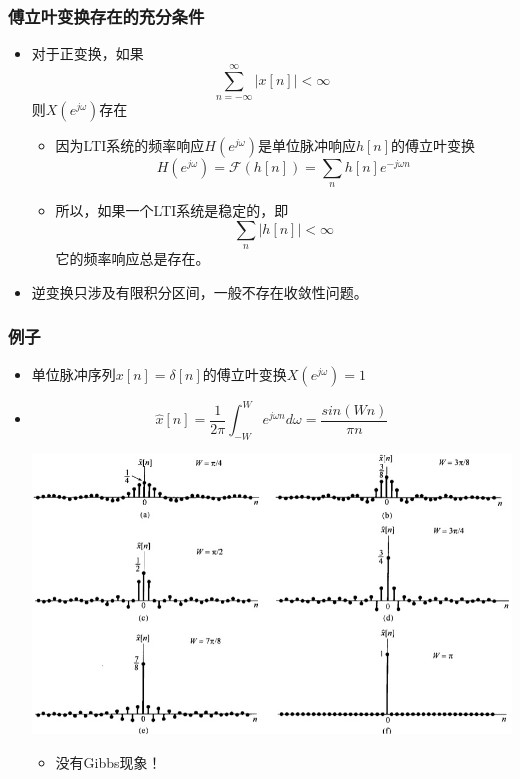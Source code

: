 \documentclass[CJKutf8,xcolor=pdftex,dvipsnames,table]{beamer}
\begin{document}
\begin{CJK*}{UTF8}{song}
\begin{frame}
  \end{frame}  
  
  \begin{frame}
    \frametitle{傅立叶变换存在的充分条件}
    \begin{itemize}
    \item 对于正变换，如果
    \[
    	 \sum_{n=-\infty}^{\infty}|x[n]| < \infty
    \]
    则$X(e^{j\omega})$存在
    	\begin{itemize}
		\item 因为LTI系统的频率响应$H(e^{j\omega})$是单位脉冲响应$h[n]$的傅立叶变换
		\[
			H(e^{j\omega})=\mathscr{F}(h[n])=\sum_n h[n]e^{-j\omega n}
		\]   
		\item 所以，如果一个LTI系统是稳定的，即
		\[
			\sum_n|h[n]| < \infty
		\]
		它的频率响应总是存在。		
		\end{itemize}
    \item 逆变换只涉及有限积分区间，一般不存在收敛性问题。
    
 
    \end{itemize}

  \end{frame} 
        
  \begin{frame}
    \frametitle{例子}
    \begin{itemize}
    \item 单位脉冲序列$x[n]=\delta[n]$的傅立叶变换$X(e^{j\omega})=1$
	\item 
	\[
	\hat{x}[n] = \frac{1}{2\pi}\int_{-W}^{W} e^{j\omega n}d\omega = \frac{sin(Wn)}{\pi n}
	\]    
    	\begin{center}
    	\includegraphics[scale=.3]{ss-c-f5-7}
    	\end{center}   
		\begin{itemize}
		\item 没有Gibbs现象！
		\end{itemize}
    \end{itemize}


\end{frame}
\end{CJK*}
\end{document}
